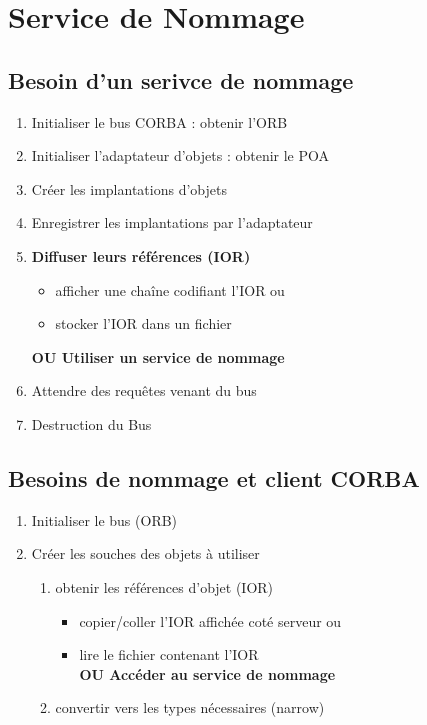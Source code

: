 \section{Service de Nommage}

    \subsection{Besoin d'un serivce de nommage}

        \begin{enumerate}
            \item Initialiser le bus CORBA : obtenir l’ORB
            \item Initialiser l’adaptateur d’objets : obtenir le POA
            \item Créer les implantations d’objets
            \item Enregistrer les implantations par l’adaptateur
            \item \textbf{Diffuser leurs références (IOR)}
                    \begin{itemize}
                        \item afficher une chaîne codifiant l’IOR ou
                        \item stocker l’IOR dans un fichier
                    \end{itemize}

            \textbf{OU Utiliser un service de nommage}
            \item Attendre des requêtes venant du bus
            \item Destruction du Bus
        \end{enumerate}

    \subsection*{Besoins de nommage et client CORBA}

        \begin{enumerate}
            \item Initialiser le bus (ORB)
            \item Créer les souches des objets à utiliser
                \begin{enumerate}
                    \item obtenir les références d’objet (IOR)
                        \begin{itemize}
                            \item copier/coller l’IOR affichée coté serveur ou
                            \item lire le fichier contenant l’IOR \\
                            \textbf{OU Accéder au service de nommage}
                        \end{itemize}
                    \item convertir vers les types nécessaires (narrow)
                \end{enumerate}
        \end{enumerate}

